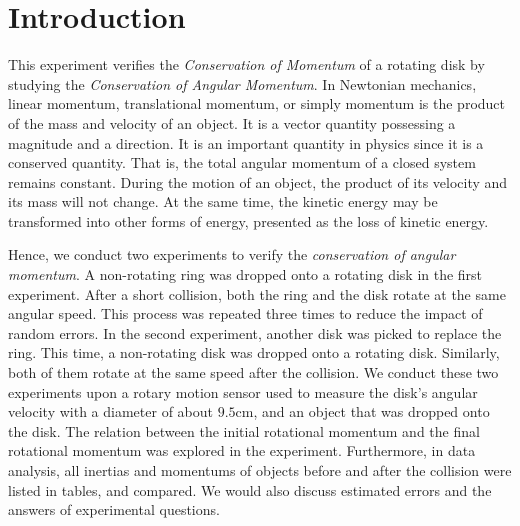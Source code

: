 \tableofcontents
\pagebreak

\parindent=0.5in

\section{Introduction}
This experiment verifies the \emph{Conservation of Momentum} of a rotating disk by studying the \emph{Conservation of Angular Momentum}. In Newtonian mechanics, linear momentum, translational momentum, or simply momentum is the product of the mass and velocity of an object. It is a vector quantity possessing a magnitude and a direction. It is an important quantity in physics since it is a conserved quantity. That is, the total angular momentum of a closed system remains constant. During the motion of an object, the product of its velocity and its mass will not change. At the same time, the kinetic energy may be transformed into other forms of energy, presented as the loss of kinetic energy.\par
Hence, we conduct two experiments to verify the \emph{conservation of angular momentum}. A non-rotating ring was dropped onto a rotating disk in the first experiment. After a short collision, both the ring and the disk rotate at the same angular speed. This process was repeated three times to reduce the impact of random errors. In the second experiment, another disk was picked to replace the ring. This time, a non-rotating disk was dropped onto a rotating disk. Similarly, both of them rotate at the same speed after the collision. We conduct these two experiments upon a rotary motion sensor used to measure the disk's angular velocity with a diameter of about $9.5$cm, and an object that was dropped onto the disk. The relation between the initial rotational momentum and the final rotational momentum was explored in the experiment. Furthermore, in data analysis, all inertias and momentums of objects before and after the collision were listed in tables, and compared. We would also discuss estimated errors and the answers of experimental questions.

